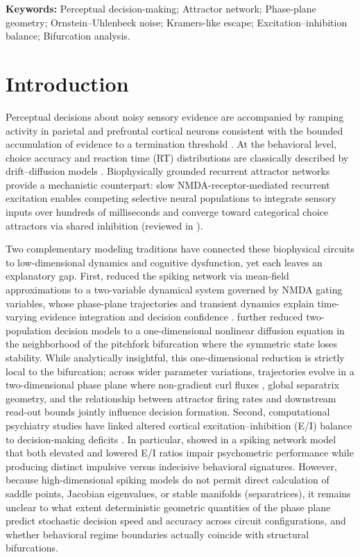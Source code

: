 \documentclass[11pt]{article}
\begin{document}
	\noindent\textbf{Keywords:} Perceptual decision-making; Attractor network; Phase-plane geometry; Ornstein--Uhlenbeck noise; Kramers-like escape; Excitation--inhibition balance; Bifurcation analysis.
	
	\section{Introduction}
	Perceptual decisions about noisy sensory evidence are accompanied by ramping activity in parietal and prefrontal cortical neurons consistent with the bounded accumulation of evidence to a termination threshold \citep{ShadlenNewsome2001, RoitmanShadlen2002, GoldShadlen2007, Kiani2008}. At the behavioral level, choice accuracy and reaction time (RT) distributions are classically described by drift--diffusion models \citep{RatcliffMcKoon2008, Bogacz2006, Palmer2005}. Biophysically grounded recurrent attractor networks provide a mechanistic counterpart: slow NMDA-receptor-mediated recurrent excitation \citep{Wang1999} enables competing selective neural populations to integrate sensory inputs over hundreds of milliseconds and converge toward categorical choice attractors via shared inhibition \citep{Wang2002, WongWang2006, Wong2007, WongHuk2008} (reviewed in \citealp{Deco2013}).
	
	Two complementary modeling traditions have connected these biophysical circuits to low-dimensional dynamics and cognitive dysfunction, yet each leaves an explanatory gap. First, \citet{WongWang2006} reduced the spiking network via mean-field approximations to a two-variable dynamical system governed by NMDA gating variables, whose phase-plane trajectories and transient dynamics explain time-varying evidence integration and decision confidence \citep{Wong2007, WongHuk2008, Insabato2010}. \citet{RoxinLedberg2008} further reduced two-population decision models to a one-dimensional nonlinear diffusion equation in the neighborhood of the pitchfork bifurcation where the symmetric state loses stability. While analytically insightful, this one-dimensional reduction is strictly local to the bifurcation; across wider parameter variations, trajectories evolve in a two-dimensional phase plane where non-gradient curl fluxes \citep{YeLi2021}, global separatrix geometry, and the relationship between attractor firing rates and downstream read-out bounds \citep{Kiani2008, Standage2011, Niyogi2013, Hanks2014, Standage2014} jointly influence decision formation. Second, computational psychiatry studies have linked altered cortical excitation--inhibition (E/I) balance to decision-making deficits \citep{BrunelWang2001, AbbottChance2005, Murray2014, Lam2022}. In particular, \citet{Lam2022} showed in a spiking network model that both elevated and lowered E/I ratios impair psychometric performance while producing distinct impulsive versus indecisive behavioral signatures. However, because high-dimensional spiking models do not permit direct calculation of saddle points, Jacobian eigenvalues, or stable manifolds (separatrices), it remains unclear to what extent deterministic geometric quantities of the phase plane predict stochastic decision speed and accuracy across circuit configurations, and whether behavioral regime boundaries actually coincide with structural bifurcations.
	
\end{document}
